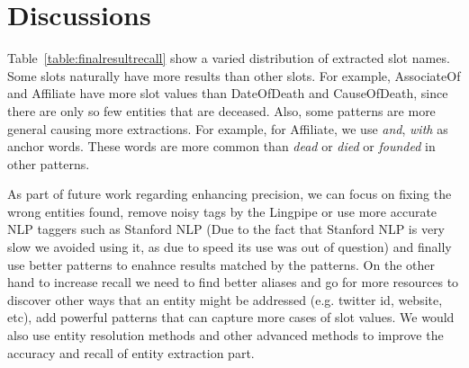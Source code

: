 

\section{Discussions}


Table~\ref{table:finalresultrecall} show a varied distribution of extracted slot names. Some slots naturally have more results than other slots. For example, AssociateOf and Affiliate have more slot values than DateOfDeath and CauseOfDeath, since there are only so few entities that are deceased. Also, some patterns are more general causing more extractions. For example, for Affiliate, we use \textit{and}, \textit{with} as anchor words. These words are more common than \textit{dead} or \textit{died} or \textit{founded} in other patterns. 







As part of future work regarding enhancing precision, we can focus on fixing the wrong entities found, remove noisy tags by the Lingpipe or use more accurate NLP taggers such as Stanford NLP (Due to the fact that Stanford NLP is very slow we avoided using it, as due to speed its use was out of question) and finally use better patterns to enahnce results matched by the patterns.  On the other hand to increase recall we need to find better aliases and go for more resources to discover other ways that an entity might be addressed (e.g. twitter id, website, etc), add powerful patterns that can capture more cases of slot values. We would also use entity resolution methods and other advanced methods to improve 
the accuracy and recall of entity extraction part. 

